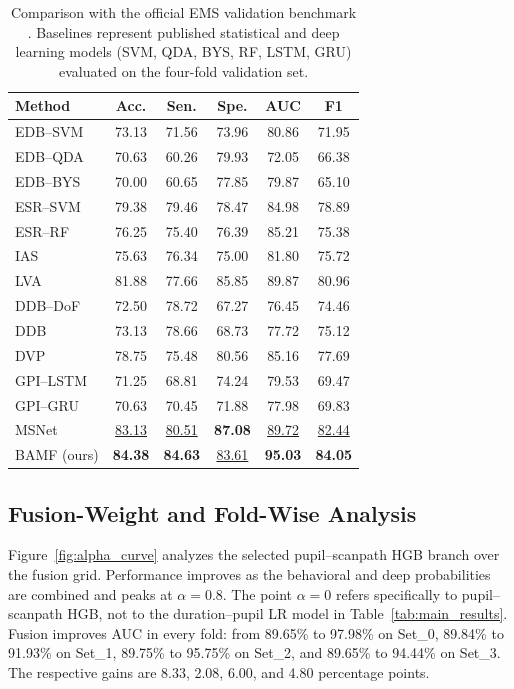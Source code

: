 \documentclass[conference,a4paper]{IEEEtran}
\begin{document}
\begin{table}[t]
\caption{Comparison with the official EMS validation benchmark \cite{song2024ems}. Baselines represent published statistical and deep learning models (SVM, QDA, BYS, RF, LSTM, GRU) evaluated on the four-fold validation set.} 
\label{tab:benchmark}
\centering
\footnotesize
\setlength{\tabcolsep}{7.0pt}
\begin{tabular}{lccccc}
\toprule
Method & Acc. & Sen. & Spe. & AUC & F1 \\
\midrule
EDB--SVM & 73.13 & 71.56 & 73.96 & 80.86 & 71.95 \\
EDB--QDA & 70.63 & 60.26 & 79.93 & 72.05 & 66.38 \\
EDB--BYS & 70.00 & 60.65 & 77.85 & 79.87 & 65.10 \\
ESR--SVM & 79.38 & 79.46 & 78.47 & 84.98 & 78.89 \\
ESR--RF & 76.25 & 75.40 & 76.39 & 85.21 & 75.38 \\
IAS & 75.63 & 76.34 & 75.00 & 81.80 & 75.72 \\
LVA & 81.88 & 77.66 & 85.85 & 89.87 & 80.96 \\
DDB--DoF & 72.50 & 78.72 & 67.27 & 76.45 & 74.46 \\
DDB & 73.13 & 78.66 & 68.73 & 77.72 & 75.12 \\
DVP & 78.75 & 75.48 & 80.56 & 85.16 & 77.69 \\
GPI--LSTM & 71.25 & 68.81 & 74.24 & 79.53 & 69.47 \\
GPI--GRU & 70.63 & 70.45 & 71.88 & 77.98 & 69.83 \\
MSNet & \underline{83.13} & \underline{80.51} & \textbf{87.08} & \underline{89.72} & \underline{82.44} \\
\midrule
BAMF (ours) & \textbf{84.38} & \textbf{84.63} & \underline{83.61} & \textbf{95.03} & \textbf{84.05} \\
\bottomrule
\end{tabular}
\end{table}

\subsection{Fusion-Weight and Fold-Wise Analysis}
Figure~\ref{fig:alpha_curve} analyzes the selected pupil--scanpath HGB branch over the fusion grid. Performance improves as the behavioral and deep probabilities are combined and peaks at $\alpha=0.8$. The point $\alpha=0$ refers specifically to pupil--scanpath HGB, not to the duration--pupil LR model in Table~\ref{tab:main_results}. Fusion improves AUC in every fold: from 89.65\% to 97.98\% on Set\_0, 89.84\% to 91.93\% on Set\_1, 89.75\% to 95.75\% on Set\_2, and 89.65\% to 94.44\% on Set\_3. The respective gains are 8.33, 2.08, 6.00, and 4.80 percentage points.
\end{document}
